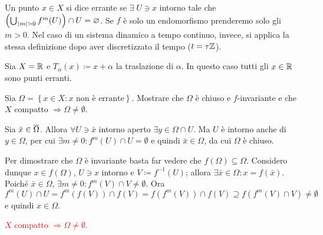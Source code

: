 \begin{definition}
    Un punto $ x\in X $ si dice errante se $ \exists\; U\ni x $ intorno tale che $ \left( \bigcup_{\; \abs{m}>0} f^m(U) \right) \cap U = \varnothing $.
    Se $ f $ è solo un endomorfismo prenderemo solo gli $ m > 0 $. Nel caso di un sistema dinamico a tempo continuo, invece, si applica la stessa definizione dopo aver discretizzato il tempo ($ t = \tau\mathbb{Z} $).
\end{definition}
\begin{example}
    Sia $ X = \mathbb{R} $ e $ T_\alpha (x) \coloneqq x + \alpha $ la traslazione di $ \alpha $. In questo caso tutti gli $ x\in\mathbb{R} $ sono punti erranti.
\end{example}
\begin{exercise}
    Sia $ \Omega = \left\{ x\in X : x \text{ non è errante} \right\} $. Mostrare che $ \Omega $ è chiuso e $ f $-invariante e che $ X $ compatto $ \Rightarrow \Omega \neq \emptyset $.
\end{exercise}
\begin{solution}
    Sia $ \bar x \in \overline{\Omega} $. Allora $ \forall U\ni \bar x $ intorno aperto $ \exists y\in\Omega\cap U $. Ma $ U $ è intorno anche di $ y\in \Omega $, per cui $ \exists m\neq 0 : f^m(U)\cap U=\emptyset $ e quindi $ \bar x \in \Omega $, da cui $ \Omega $ è chiuso.

    Per dimostrare che $ \Omega $ è invariante basta far vedere che $ f(\Omega) \subseteq \Omega $. Considero dunque $ x\in f(\Omega) $, $ U\ni x $ intorno e $ V \coloneqq f^{-1}(U) $; allora $ \exists \bar x\in\Omega : x = f(\bar x) $. Poiché $ \bar x\in\Omega $, $ \exists m\neq 0 : f^m(V) \cap V \neq \emptyset $. Ora $ f^m(U) \cap U = f^m(f(V)) \cap f(V) = f(f^m(V)) \cap f(V) \supseteq f(f^m(V)\cap V) \neq \emptyset $ e quindi $ x\in\Omega $.

    \textcolor{red}{$ X $ compatto $ \Rightarrow \Omega \neq \emptyset $.}
\end{solution}

